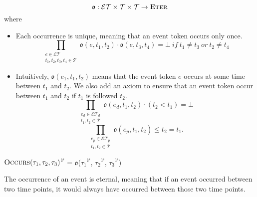 $$\mathfrak{o} : \mathcal{ET} \times \mathcal{T} \times \mathcal{T} \to \textsc{Eter}$$ where
\begin{itemize}
    \item
          Each occurrence is unique, meaning that an event token occurs only once.
          \begin{equation}\label{ax:occurs_once}
              \prod_{\substack{e \in \mathcal{ET} \\ t_1, t_2, t_3, t_4 \in \mathcal{T}}} \mathfrak{o}(e, t_1, t_2) \cdot \mathfrak{o}(e, t_3, t_4) = \bot  \ if \ t_1 \neq t_3 \ or \  t_2 \neq t_4
          \end{equation}
    \item
          Intuitively, $\mathfrak{o}(e_1, t_1, t_2)$ means that the event token $e$ occurs at some time between $t_1$ and $t_2$.
          We also add an axiom to ensure that an event token occur between $t_1$ and $t_2$ if $t_1$ is followed $t_2$.
          \begin{equation}
              \prod_{\substack{e_d \in \mathcal{ET}_d \\ t_1, t_2 \in \mathcal{T}}} \mathfrak{o}(e_d, t_1, t_2) \cdot (t_2 < t_1) = \bot
          \end{equation}
          \begin{equation}
              \prod_{\substack{e_p \in \mathcal{ET}_p \\ t_1, t_2 \in \mathcal{T}}} \mathfrak{o}(e_p, t_1, t_2) \leq t_2 = t_1.
          \end{equation}
\end{itemize}

\textlbrackdbl $\textsc{Occurs}(\tau_1, \tau_2, \tau_3)$\textrbrackdbl$^{\mathcal{V}}$ = $\mathfrak{o}$(\textlbrackdbl $\tau_1$\textrbrackdbl$^{\mathcal{V}}$, \textlbrackdbl $\tau_2$\textrbrackdbl$^{\mathcal{V}}$, \textlbrackdbl$\tau_3$\textrbrackdbl$^{\mathcal{V}}$)

The occurrence of an event is eternal, meaning that if an event occurred between two time points, it would always have occurred between those two time points.




